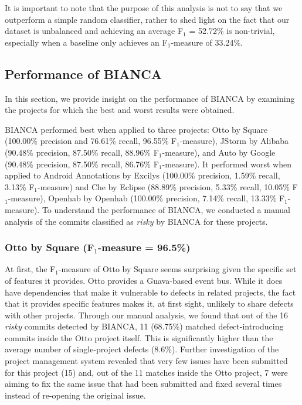 \documentclass[12pt]{report}
\begin{document}
It is important to note that the purpose of this analysis is not to say
that we outperform a simple random classifier, rather to shed light on
the fact that our dataset is unbalanced and achieving an average F\(_1\)
= 52.72\% is non-trivial, especially when a baseline only achieves an
F\(_1\)-measure of 33.24\%.

\subsection{Performance of BIANCA}\label{performance-of-bianca}

In this section, we provide insight on the performance of BIANCA by
examining the projects for which the best and worst results were
obtained.

BIANCA performed best when applied to three projects: Otto by Square
(100.00\% precision and 76.61\% recall, 96.55\% F\(_1\)-measure), JStorm
by Alibaba (90.48\% precision, 87.50\% recall, 88.96\% F\(_1\)-measure),
and Auto by Google (90.48\% precision, 87.50\% recall, 86.76\%
F\(_1\)-measure). It performed worst when applied to Android Annotations
by Excilys (100.00\% precision, 1.59\% recall, 3.13\% F\(_1\)-measure)
and Che by Eclipse (88.89\% precision, 5.33\% recall, 10.05\%
F\(_1\)-measure), Openhab by Openhab (100.00\% precision, 7.14\% recall,
13.33\% F\(_1\)-measure). To understand the performance of BIANCA, we
conducted a manual analysis of the commits classified as \emph{risky} by
BIANCA for these projects.

\subsubsection{\texorpdfstring{Otto by Square (F\(_1\)-measure =
96.5\%)}{Otto by Square (F\_1-measure = 96.5\%)}}\label{otto-by-square-fux5f1-measure-96.5}

At first, the F\(_1\)-measure of Otto by Square seems surprising given
the specific set of features it provides. Otto provides a Guava-based
event bus. While it does have dependencies that make it vulnerable to
defects in related projects, the fact that it provides specific features
makes it, at first sight, unlikely to share defects with other projects.
Through our manual analysis, we found that out of the 16 \emph{risky}
commits detected by BIANCA, 11 (68.75\%) matched defect-introducing
commits inside the Otto project itself. This is significantly higher
than the average number of single-project defects (8.6\%). Further
investigation of the project management system revealed that very few
issues have been submitted for this project (15) and, out of the 11
matches inside the Otto project, 7 were aiming to fix the same issue
that had been submitted and fixed several times instead of re-opening
the original issue.
\end{document}
